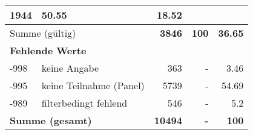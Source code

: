 \begin{longtable}{lXrrr}
       \num{1944} &
       \num[round-mode=places,round-precision=2]{50.55} &
         \num[round-mode=places,round-precision=2]{18.52} \\
     \midrule
     \multicolumn{2}{l}{Summe (gültig)} &
       \textbf{\num{3846}} &
     \textbf{\num{100}} &
       \textbf{\num[round-mode=places,round-precision=2]{36.65}} \\
     \multicolumn{5}{l}{\textbf{Fehlende Werte}}\\
       -998 &
       keine Angabe &
         \num{363} &
        - &
         \num[round-mode=places,round-precision=2]{3.46} \\
       -995 &
       keine Teilnahme (Panel) &
         \num{5739} &
        - &
         \num[round-mode=places,round-precision=2]{54.69} \\
       -989 &
       filterbedingt fehlend &
         \num{546} &
        - &
         \num[round-mode=places,round-precision=2]{5.2} \\
     \midrule
     \multicolumn{2}{l}{\textbf{Summe (gesamt)}} &
          \textbf{\num{10494}} &
        \textbf{-} &
        \textbf{\num{100}} \\
     \bottomrule
     \end{longtable}
     

